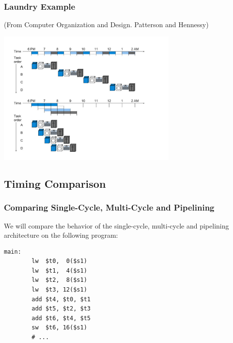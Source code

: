 \documentclass{beamer}
\begin{document}
\begin{frame}%
\frametitle{Laundry Example}

\tiny
(From Computer Organization and Design. Patterson and Hennessy)

\begin{center}
  \includegraphics[width=9cm]{pipelining_laundry.pdf}
\end{center}

\end{frame}


\subsection{Timing Comparison}

\begin{frame}[fragile]
\frametitle{Comparing Single-Cycle, Multi-Cycle and Pipelining}

We will compare the behavior of the single-cycle, multi-cycle
and pipelining architecture on the following program:

\vspace{0.3cm}

\scriptsize

\begin{lstlisting}
main:
        lw  $t0,  0($s1)
        lw  $t1,  4($s1)
        lw  $t2,  8($s1)
        lw  $t3, 12($s1)
        add $t4, $t0, $t1
        add $t5, $t2, $t3
        add $t6, $t4, $t5
        sw  $t6, 16($s1)
        # ...
\end{lstlisting}

\end{frame}
\end{document}
